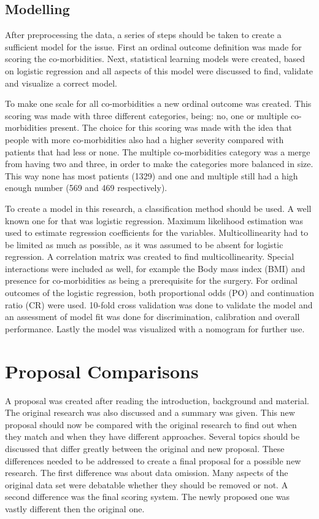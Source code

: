 \documentclass[10pt,a4paper]{article}
\begin{document}
	\subsection{Modelling}
	
	After preprocessing the data, a series of steps should be taken to create a sufficient model for the issue. First an ordinal outcome definition was made for scoring the co-morbidities. Next, statistical learning models were created, based on logistic regression and all aspects of this model were discussed to find, validate and visualize a correct model.
	
	To make one scale for all co-morbidities a new ordinal outcome was created. This scoring was made with three different categories, being: no, one or multiple co-morbidities present. The choice for this scoring was made with the idea that people with more co-morbidities also had a higher severity compared with patients that had less or none. The multiple co-morbidities category was a merge from having two and three, in order to make the categories more balanced in size. This way none has most patients (1329) and one and multiple still had a high enough number (569 and 469 respectively). 
	
	To create a model in this research, a classification method should be used. A well known one for that was logistic regression. Maximum likelihood estimation was used to estimate regression coefficients for the variables. Multicollinearity had to be limited as much as possible, as it was assumed to be absent for logistic regression. A correlation matrix was created to find multicollinearity. Special interactions were included as well, for example the Body mass index (BMI) and presence for co-morbidities as being a prerequisite for the surgery. For ordinal outcomes of the logistic regression, both proportional odds (PO) and continuation ratio (CR) were used. 10-fold cross validation was done to validate the model and an assessment of model fit was done for discrimination, calibration and overall performance. Lastly the model was visualized with a nomogram for further use.
	
	\clearpage
	
	\section{Proposal Comparisons}
	\label{sec:ProposalComparisons}
	
	A proposal was created after reading the introduction, background and material. The original research was also discussed and a summary was given. This new proposal should now be compared with the original research to find out when they match and when they have different approaches. Several topics should be discussed that differ greatly between the original and new proposal. These differences needed to be addressed to create a final proposal for a possible new research. The first difference was about data omission. Many aspects of the original data set were debatable whether they should be removed or not. A second difference was the final scoring system. The newly proposed one was vastly different then the original one.
	
\end{document}
